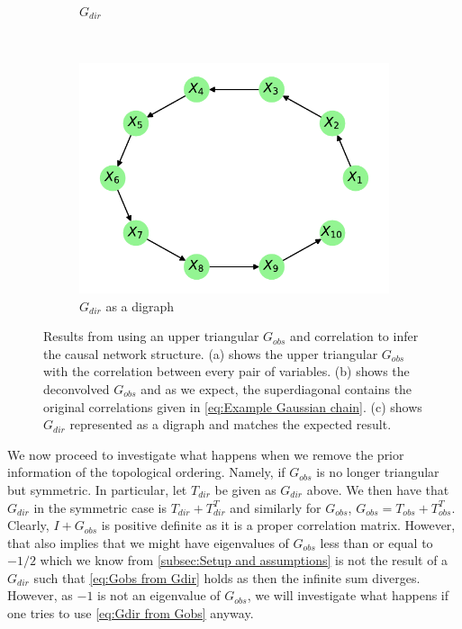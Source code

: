 \documentclass[../Thesis.tex]{subfiles}
\begin{document}
\begin{figure}[h]
\begin{subfigure}[t]{0.49\textwidth}
        \caption{$G_{dir}$}
        \label{subfig:Gaussian chain triangular G_obs using correlation - G_dir}
    \end{subfigure}
    \\[\baselineskip]
    \begin{subfigure}[t]{0.49\textwidth}
        \centering
        \includegraphics[width=.9\linewidth]{figures/Gaussian Chain Theoretical/Chain graph from triangular G obs.pdf}
        \caption{$G_{dir}$ as a digraph}
    \end{subfigure}
    \caption{Results from using an upper triangular $G_{obs}$ and correlation to infer the causal network structure. (a) shows the upper triangular $G_{obs}$ with the correlation between every pair of variables. (b) shows the deconvolved $G_{obs}$ and as we expect, the superdiagonal contains the original correlations given in \autoref{eq:Example Gaussian chain}. (c) shows $G_{dir}$ represented as a digraph and matches the expected result.}
    \label{fig:Gaussian chain triangular G_obs using correlation}
\end{figure}
We now proceed to investigate what happens when we remove the prior information of the topological ordering. Namely, if $G_{obs}$ is no longer triangular but symmetric. In particular, let $T_{dir}$ be given as $G_{dir}$ above. We then have that $G_{dir}$ in the symmetric case is $T_{dir} + T_{dir}^T$ and similarly for $G_{obs}$, $G_{obs} = T_{obs} + T_{obs}^T$. Clearly, $I + G_{obs}$ is positive definite as it is a proper correlation matrix. However, that also implies that we might have eigenvalues of $G_{obs}$ less than or equal to $-1/2$ which we know from \autoref{subsec:Setup and assumptions} is not the result of a $G_{dir}$ such that \autoref{eq:Gobs from Gdir} holds as then the infinite sum diverges. However, as $-1$ is not an eigenvalue of $G_{obs}$, we will investigate what happens if one tries to use \autoref{eq:Gdir from Gobs} anyway.
\end{document}
